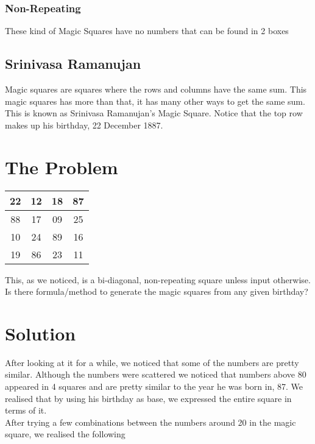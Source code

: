 \documentclass{article}
\begin{document}
    \subsubsection{Non-Repeating}
            These kind of Magic Squares have no numbers that can be found in 2 boxes
\subsection{Srinivasa Ramanujan}
    Magic squares are squares where the rows and columns have the same sum. This magic squares has more than that, it has many other ways to get the same sum. This is known as Srinivasa Ramanujan's Magic Square.
    Notice that the top row makes up his birthday, 22 December 1887.

\section{The Problem}
\begin{center}
    \begin{tabular}{|c|c|c|c|}
        \hline
        22 & 12 & 18 & 87 \\
        \hline
        88 & 17 & 09 & 25 \\
        \hline
        10 & 24 & 89 & 16 \\
        \hline
        19 & 86 & 23 & 11 \\
        \hline
    \end{tabular}
\end{center}
\space
This, as we noticed, is a bi-diagonal, non-repeating square unless input otherwise.
Is there formula/method to generate the magic squares from any given birthday?

\newpage
\section{Solution}
After looking at it for a while, we noticed that some of the numbers are pretty similar. Although the numbers were scattered we noticed that numbers above 80 appeared in 4 squares and are pretty similar to the year he was born in, 87. We realised that by using his birthday as base, we expressed the entire square in terms of it.\\
After trying a few combinations between the numbers around 20 in the magic square, we realised the following\\
\end{document}
